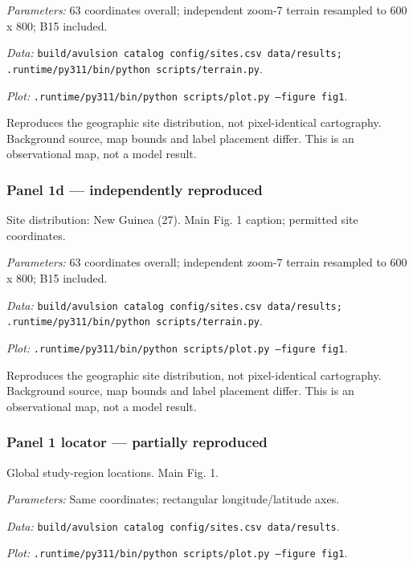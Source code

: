 \textit{Parameters:} 63 coordinates overall; independent zoom-7 terrain resampled to 600 x 800; B15 included.

\textit{Data:} \texttt{build/\allowbreak{}avulsion catalog config/\allowbreak{}sites.csv data/\allowbreak{}results; .runtime/\allowbreak{}py311/\allowbreak{}bin/\allowbreak{}python scripts/\allowbreak{}terrain.py}.

\textit{Plot:} \texttt{.runtime/\allowbreak{}py311/\allowbreak{}bin/\allowbreak{}python scripts/\allowbreak{}plot.py --figure fig1}.

Reproduces the geographic site distribution, not pixel-identical cartography. Background source, map bounds and label placement differ. This is an observational map, not a model result.

\subsubsection*{Panel 1d --- independently reproduced}
Site distribution: New Guinea (27). Main Fig. 1 caption; permitted site coordinates.

\textit{Parameters:} 63 coordinates overall; independent zoom-7 terrain resampled to 600 x 800; B15 included.

\textit{Data:} \texttt{build/\allowbreak{}avulsion catalog config/\allowbreak{}sites.csv data/\allowbreak{}results; .runtime/\allowbreak{}py311/\allowbreak{}bin/\allowbreak{}python scripts/\allowbreak{}terrain.py}.

\textit{Plot:} \texttt{.runtime/\allowbreak{}py311/\allowbreak{}bin/\allowbreak{}python scripts/\allowbreak{}plot.py --figure fig1}.

Reproduces the geographic site distribution, not pixel-identical cartography. Background source, map bounds and label placement differ. This is an observational map, not a model result.

\subsubsection*{Panel 1 locator --- partially reproduced}
Global study-region locations. Main Fig. 1.

\textit{Parameters:} Same coordinates; rectangular longitude/latitude axes.

\textit{Data:} \texttt{build/\allowbreak{}avulsion catalog config/\allowbreak{}sites.csv data/\allowbreak{}results}.

\textit{Plot:} \texttt{.runtime/\allowbreak{}py311/\allowbreak{}bin/\allowbreak{}python scripts/\allowbreak{}plot.py --figure fig1}.

